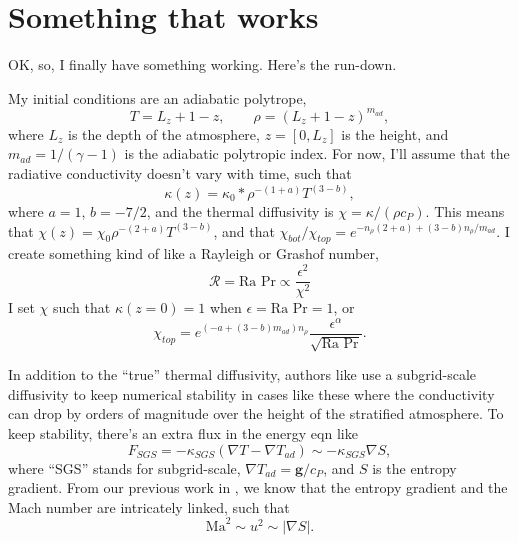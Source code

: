 \documentclass[aps, pre, onecolumn, nofootinbib, notitlepage, groupedaddress, amsfonts, amssymb, amsmath, longbibliography]{revtex4-1}
\newcommand{\grad}{\ensuremath{\nabla}}
\begin{document}
\section{Something that works}
OK, so, I finally have something working.  Here's the run-down.

My initial conditions are an adiabatic polytrope,
$$
T = L_z + 1 - z, \qquad \rho = (L_z + 1 - z)^{m_{ad}},
$$
where $L_z$ is the depth of the atmosphere, $z = [0, L_z]$ is the
height, and $m_{ad} = 1/(\gamma-1)$ is the adiabatic polytropic index. For
now, I'll assume that the radiative conductivity doesn't vary with time, such that
$$
\kappa(z) = \kappa_0 * \rho^{-(1+a)} T^{(3-b)},
$$
where $a = 1$, $b = -7/2$, and the thermal diffusivity is 
$\chi = \kappa / (\rho c_P)$. This means that $\chi(z) = \chi_0 \rho^{-(2+a)} T^{(3 - b)}$, and that
$\chi_{bot}/\chi_{top} = e^{-n_\rho(2+a) + (3-b)n_\rho/m_{ad}}$. I create something
kind of like a Rayleigh or Grashof number,
$$
\mathcal{R} = \text{Ra Pr} \propto \frac{\epsilon^2}{\chi^2}
$$
I set $\chi$ such that $\kappa(z=0) = 1$ when $\epsilon = \text{Ra Pr} = 1$, or
$$
\chi_{top} = e^{(-a + (3-b)m_{ad})n_{\rho}}\frac{\epsilon^{\alpha}}{\sqrt{\text{Ra Pr}}}.
$$

In addition to the ``true'' thermal diffusivity, authors like \cite{kapyla&all2017}
use a subgrid-scale diffusivity to keep numerical stability in cases like these
where the conductivity can drop by orders of magnitude over the height of the
stratified atmosphere. To keep stability, there's an extra flux in the energy eqn
like
$$
F_{SGS} = -\kappa_{SGS}(\grad T - \grad T_{ad}) \sim -\kappa_{SGS}\grad S,
$$
where ``SGS'' stands for subgrid-scale, $\grad T_{ad} = \bm{g}/c_P$, and $S$
is the entropy gradient. From our previous work in \cite{anders&brown2017}, we
know that the entropy gradient and the Mach number are intricately linked, such
that
$$
\text{Ma}^2 \sim u^2 \sim |\grad S|.
$$
\end{document}

